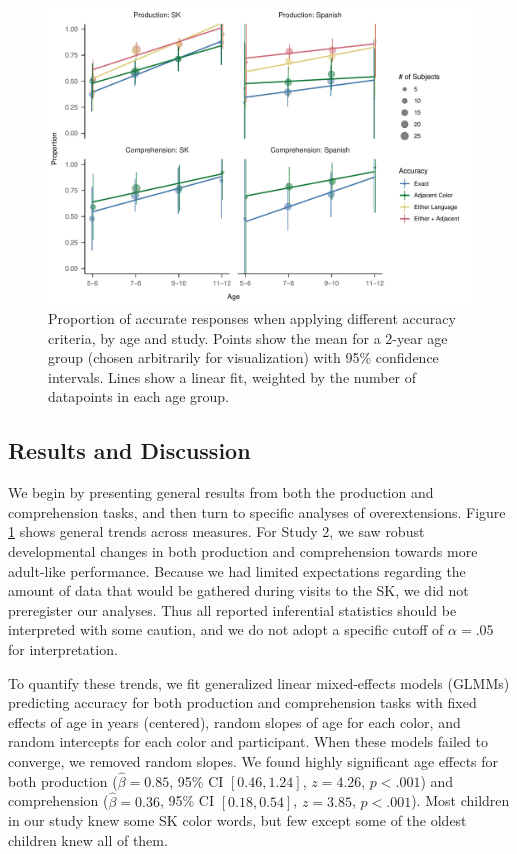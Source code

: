 \documentclass[
  english,
  ,apa7,floatsintext]{apa6}
\begin{document}
\begin{figure}
\centering
\includegraphics{amazon_color_files/figure-latex/study23-accuracy-1.pdf}
\caption{\label{fig:study23-accuracy}Proportion of accurate responses when applying different accuracy criteria, by age and study. Points show the mean for a 2-year age group (chosen arbitrarily for visualization) with 95\% confidence intervals. Lines show a linear fit, weighted by the number of datapoints in each age group.}
\end{figure}

\hypertarget{results-and-discussion-1}{%
\subsection{Results and Discussion}\label{results-and-discussion-1}}

We begin by presenting general results from both the production and comprehension tasks, and then turn to specific analyses of overextensions. Figure \ref{fig:study23-accuracy} shows general trends across measures. For Study 2, we saw robust developmental changes in both production and comprehension towards more adult-like performance. Because we had limited expectations regarding the amount of data that would be gathered during visits to the SK, we did not preregister our analyses. Thus all reported inferential statistics should be interpreted with some caution, and we do not adopt a specific cutoff of \(\alpha = .05\) for interpretation.

To quantify these trends, we fit generalized linear mixed-effects models (GLMMs) predicting accuracy for both production and comprehension tasks with fixed effects of age in years (centered), random slopes of age for each color, and random intercepts for each color and participant. When these models failed to converge, we removed random slopes. We found highly significant age effects for both production (\(\hat{\beta} = 0.85\), 95\% CI \([0.46, 1.24]\), \(z = 4.26\), \(p < .001\)) and comprehension (\(\hat{\beta} = 0.36\), 95\% CI \([0.18, 0.54]\), \(z = 3.85\), \(p < .001\)). Most children in our study knew some SK color words, but few except some of the oldest children knew all of them.
\end{document}
